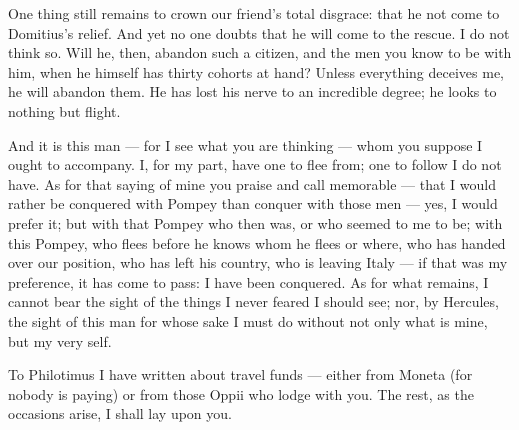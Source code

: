

 One thing still remains to crown our friend's total disgrace: that he not come to Domitius's relief. And yet no one doubts that he will come to the rescue. I do not think so. Will he, then, abandon such a citizen, and the men you know to be with him, when he himself has thirty cohorts at hand? Unless everything deceives me, he will abandon them. He has lost his nerve to an incredible degree; he looks to nothing but flight.

 And it is this man --- for I see what you are thinking --- whom you suppose I ought to accompany. I, for my part, have one to flee from; one to follow I do not have. As for that saying of mine you praise and call memorable --- that I would rather be conquered with Pompey than conquer with those men --- yes, I would prefer it; but with that Pompey who then was, or who seemed to me to be; with this Pompey, who flees before he knows whom he flees or where, who has handed over our position, who has left his country, who is leaving Italy --- if that was my preference, it has come to pass: I have been conquered. As for what remains, I cannot bear the sight of the things I never feared I should see; nor, by Hercules, the sight of this man for whose sake I must do without not only what is mine, but my very self.

 To Philotimus I have written about travel funds --- either from Moneta (for nobody is paying) or from those Oppii who lodge with you. The rest, as the occasions arise, I shall lay upon you.
